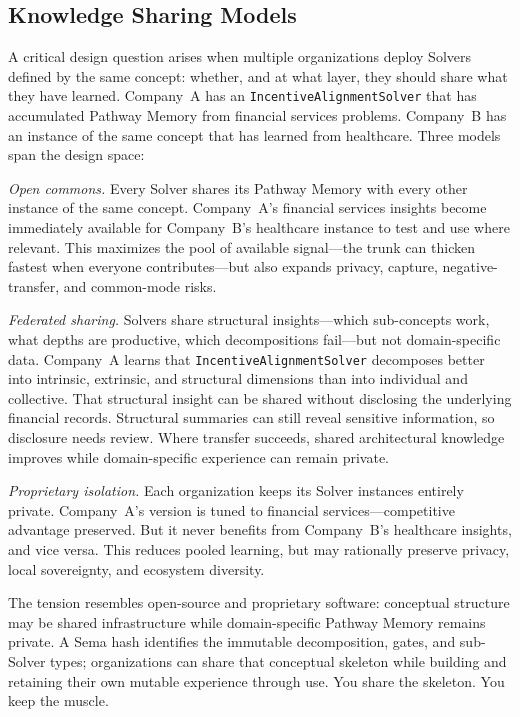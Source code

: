 \documentclass[11pt]{article}
\let\oldtexttt\texttt
\renewcommand{\texttt}[1]{\oldtexttt{\small #1}}
\begin{document}
\subsection{Knowledge Sharing Models}

A critical design question arises when multiple organizations deploy Solvers defined by the same concept: whether, and at what layer, they should share what they have learned. Company~A has an \texttt{IncentiveAlignmentSolver} that has accumulated Pathway Memory from financial services problems. Company~B has an instance of the same concept that has learned from healthcare. Three models span the design space:

\emph{Open commons.} Every Solver shares its Pathway Memory with every other instance of the same concept. Company~A's financial services insights become immediately available for Company~B's healthcare instance to test and use where relevant. This maximizes the pool of available signal---the trunk can thicken fastest when everyone contributes---but also expands privacy, capture, negative-transfer, and common-mode risks.

\emph{Federated sharing.} Solvers share structural insights---which sub-concepts work, what depths are productive, which decompositions fail---but not domain-specific data. Company~A learns that \texttt{IncentiveAlignmentSolver} decomposes better into intrinsic, extrinsic, and structural dimensions than into individual and collective. That structural insight can be shared without disclosing the underlying financial records. Structural summaries can still reveal sensitive information, so disclosure needs review. Where transfer succeeds, shared architectural knowledge improves while domain-specific experience can remain private.

\emph{Proprietary isolation.} Each organization keeps its Solver instances entirely private. Company~A's version is tuned to financial services---competitive advantage preserved. But it never benefits from Company~B's healthcare insights, and vice versa. This reduces pooled learning, but may rationally preserve privacy, local sovereignty, and ecosystem diversity.

The tension resembles open-source and proprietary software: conceptual structure may be shared infrastructure while domain-specific Pathway Memory remains private. A Sema hash identifies the immutable decomposition, gates, and sub-Solver types; organizations can share that conceptual skeleton while building and retaining their own mutable experience through use. You share the skeleton. You keep the muscle.
\end{document}
